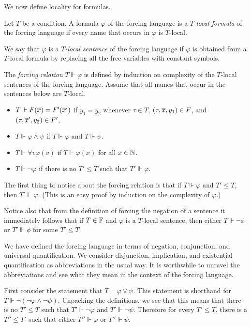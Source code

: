 We now define locality for formulas.

\begin{definition}\label{D:localFormulas}
Let $T$ be a condition.
A formula $\varphi$ of the forcing language is a $T$\textit{-local formula}
of the forcing language if every name that occurs in $\varphi$ is $T$-local.

We say that $\varphi$ is a $T$\textit{-local sentence} of the forcing language
if $\varphi$ is obtained from a $T$-local formula by replacing all the
free variables with constant symbols.
\end{definition}

\begin{definition}\label{D:forcingRel}
The \textit{forcing relation} $T\Vdash\varphi$ is defined by induction on complexity of the
$T$-local sentences of the forcing language.
Assume that all names that occur in the sentences below are $T$-local.
\begin{itemize}
\item $T\Vdash F(\overline{x})=F'(\overline{x}')$ if $y_1=y_2$ whenever
	$\tau\in T$, $(\tau,\overline{x},y_1)\in F$, and $(\tau,\overline{x}',y_2)\in F'$.
\item $T\Vdash \varphi\land\psi$ if $T\Vdash \varphi$ and $T\Vdash \psi$.
\item $T\Vdash \forall v \varphi(v)$ if $T\Vdash \varphi(x)$ for all $x\in\mathbb{N}$.
\item $T\Vdash\neg\varphi$ if there is no $T'\leq T$ such that $T'\Vdash\varphi$.
\end{itemize}
\end{definition}

The first thing to notice about the forcing relation is that if
$T\Vdash\varphi$ and $T'\leq T$, then $T'\Vdash\varphi$.
(This is an easy proof by induction on the complexity of $\varphi$.)

Notice also that from the definition of forcing the negation
of a sentence it immediately follows that
if $T\in\mathbb{F}$ and $\varphi$ is a $T$-local sentence,
then either $T\Vdash\neg\phi$ or $T'\Vdash\phi$ for some $T'\leq T$.

We have defined the forcing language in terms of
negation, conjunction, and universal quantification.
We consider disjunction, implication, and
existential quantification as abbreviations in the usual way.
It is worthwhile to unravel the abbreviations and
see what they mean in the context of the forcing language.

First consider the statement that $T\Vdash\varphi\lor\psi$.
This statement is shorthand for $T\Vdash\neg(\neg\varphi\land\neg\psi)$.
Unpacking the definitions, we see that this means that
there is no $T'\leq T$ such that $T'\Vdash\neg\varphi$ and
$T'\Vdash\neg\psi$.
Therefore for every $T'\leq T$, there is a $T''\leq T'$
such that either $T''\Vdash\varphi$ or $T''\Vdash\psi$.

